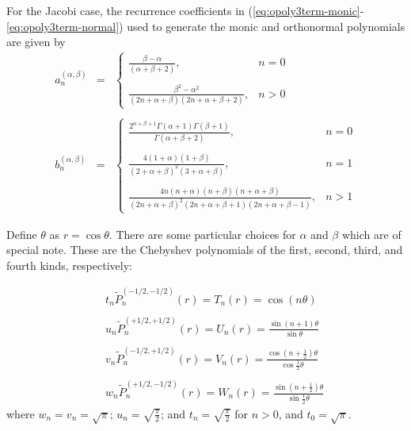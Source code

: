 For the Jacobi case, the recurrence coefficients in 
(\ref{eq:opoly3term-monic}-\ref{eq:opoly3term-normal}) used to generate the
monic and orthonormal polynomials are given by
\[ \begin{array}{lll}
     a^{(\alpha, \beta)}_n & = & \left\{ \begin{array}{ll}
       \frac{\beta - \alpha}{(\alpha + \beta + 2)}, & n = 0\\
       & \\
       \frac{\beta^2 - \alpha^2}{(2 n + \alpha + \beta) (2 n + \alpha + \beta
       + 2)}, & n > 0
     \end{array} \right.\\
     &  & \\
     b^{(\alpha, \beta)}_n & = & \left\{ \begin{array}{ll}
       \frac{2^{\alpha + \beta + 1} \Gamma (\alpha + 1) \Gamma (\beta +
       1)}{\Gamma (\alpha + \beta + 2)}, & n = 0\\
       & \\
       \frac{4 (1 + \alpha) (1 + \beta)}{(2 + \alpha + \beta)^2 (3 + \alpha +
       \beta)}, & n = 1\\
       & \\
       \frac{4 n (n + \alpha) (n + \beta) (n + \alpha + \beta)}{(2 n + \alpha
       + \beta)^2 (2 n + \alpha + \beta + 1) (2 n + \alpha + \beta - 1)}, & n
       > 1
     \end{array} \right.
   \end{array} \]


Define $\theta$ as $r = \cos \theta$. There are some particular choices for
$\alpha$ and $\beta$ which are of special note. These are the Chebyshev
polynomials of the first, second, third, and fourth kinds, respectively:


\begin{eqnarray}
  &  & t_n \tilde{P}_n^{(- 1 / 2, - 1 / 2)} (r) = T_n (r) = \cos (n \theta) 
  \label{eq:cheb1-def}\\
  &  &  \nonumber\\
  &  & u_n \tilde{P}_n^{(+ 1 / 2, + 1 / 2)} (r) = U_n (r) = \frac{\sin (n +
  1) \theta}{\sin \theta}  \label{eq:cheb2-def}\\
  &  &  \nonumber\\
  &  & v_n \tilde{P}_n^{(- 1 / 2, + 1 / 2)} (r) = V_n (r) = \frac{\cos \left(
  n + \frac{1}{2} \right) \theta}{\cos \frac{1}{2} \theta} 
  \label{eq:cheb3-def}\\
  &  &  \nonumber\\
  &  & w_n \tilde{P}_n^{(+ 1 / 2, - 1 / 2)} (r) = W_n (r) = \frac{\sin \left(
  n + \frac{1}{2} \right) \theta}{\sin \frac{1}{2} \theta} 
  \label{eq:cheb4-def}
\end{eqnarray}
where $w_n = v_n = \sqrt{\pi}$; $u_n = \sqrt{\frac{\pi}{2}}$; and $t_n =
\sqrt{\frac{\pi}{2}}$ for $n > 0$, and $t_0 = \sqrt{\pi}$.



